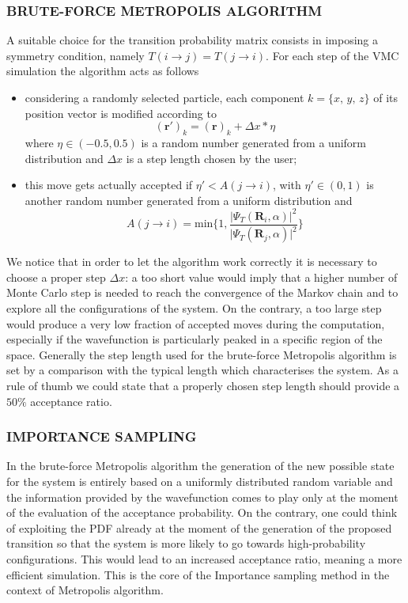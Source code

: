 \subsubsection{BRUTE-FORCE METROPOLIS ALGORITHM}
A suitable choice for the transition probability matrix consists in imposing a symmetry condition, namely $T( i\rightarrow j) = T(j \rightarrow i)$. For each step of the VMC simulation the algorithm acts as follows
\begin{itemize}
    \item considering a randomly selected particle, each  component $k = \{x,\,y,\,z\}$ of its position vector is modified according to
    \begin{equation*}
        (\bm{r}')_k = (\bm{r})_k + \Delta x \ast \eta
    \end{equation*}
    where $\eta \in (-0.5, 0.5)$ is a random number generated from a uniform distribution and $\Delta x$ is a step length chosen by the user;
    \item this move gets actually accepted if $\eta' < A(j\rightarrow i)$, with $\eta' \in (0,1)$ is another random number generated from a uniform distribution and
    \begin{equation*}
        A(j \rightarrow i) = \text{min} \bigg\{ 1, \frac{\vert \Psi_T(\bm{R}_i, \alpha) \vert^2 }{\vert \Psi_T(\bm{R}_j, \alpha) \vert^2 } \bigg\}
    \end{equation*}
\end{itemize}
We notice that in order to let the algorithm work correctly it is necessary to choose a proper step $\Delta x$: a too short value would imply that a higher number of Monte Carlo step is needed to reach the convergence of the Markov chain and to explore all the configurations of the system. On the contrary, a too large step would produce a very low fraction of accepted moves during the computation, especially if the wavefunction is particularly peaked in a specific region of the space. Generally the step length used for the brute-force Metropolis algorithm is set by a comparison with the typical length which characterises the system. As a rule of thumb we could state that a properly chosen step length should provide a $50\%$ acceptance ratio. 




\subsubsection{IMPORTANCE SAMPLING}
In the brute-force Metropolis algorithm the generation of the new possible state for the system is entirely based on a uniformly distributed random variable and the information provided by the wavefunction comes to play only at the moment of the evaluation of the acceptance probability. On the contrary, one could think of exploiting the PDF already at the moment of the generation of the proposed transition so that the system is more likely to go towards high-probability configurations. This would lead to an increased acceptance ratio, meaning a more efficient simulation. This is the core of the Importance sampling method in the context of Metropolis algorithm.


